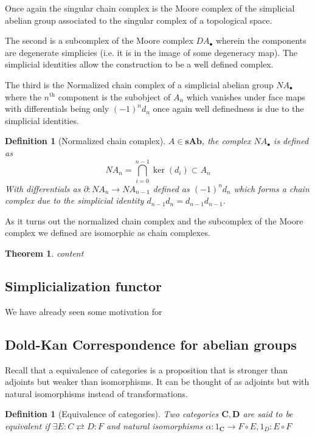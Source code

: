 \documentclass[12pt]{report}
\numberwithin{equation}{section}
\newtheorem{theorem}[dummy]{Theorem}
\newtheorem{definition}[dummy]{Definition}
\begin{document}
	Once again the singular chain complex is the Moore complex of the simplicial abelian group associated to the singular complex of a topological space.
	
	
	The second is a subcomplex of the Moore complex $DA_\bullet$ wherein the components are degenerate simplicies (i.e. it is in the image of some degeneracy map).	The simplicial identities allow the construction to be a well defined complex.
	
	The third is the Normalized chain complex of a simplicial abelian group $NA_\bullet$ where the $n^\text{th}$ component is the subobject of $A_n$ which vanishes under face maps with differentials being only $(-1)^n d_n$ once again well definedness is due to the simplicial identities.
	\begin{definition}[Normalized chain complex]
		$A \in \mathbf{sAb}$, the complex $NA_\bullet $ is defined as 
		\[ NA_n = \bigcap_{i=0}^{n-1} \ker(d_i) \subset A_n\]
		With differentials as $\partial: NA_n \to NA_{n-1}$ defined as $(-1)^n d_n$ which forms a chain complex due to the simplicial identity $d_{n-1}d_n=d_{n-1}d_{n-1}.$
	\end{definition}
	
	As it turns out the normalized chain complex and the subcomplex of the Moore complex we defined are isomorphic as chain complexes.
	
	\begin{theorem}
		content
	\end{theorem}
	\subsection{Simplicialization functor}
	We have already seen some motivation for 
	
	
	\subsection{Dold-Kan Correspondence for abelian groups}
	
	
	Recall that a equivalence of categories is a proposition that is stronger than adjoints but weaker than isomorphisms. It can be thought of as adjoints but with natural isomorphisms instead of transformations.
	\begin{definition}[Equivalence of categories]
		Two categories $\mathbf{C,D}$ are said to be equivalent if $\exists E:C \rightleftarrows D:F$ and natural isomorphisms $\alpha: 1_\mathbf{C} \to F\circ E, 1_D: E \circ F$
	\end{definition}
	
\end{document}
